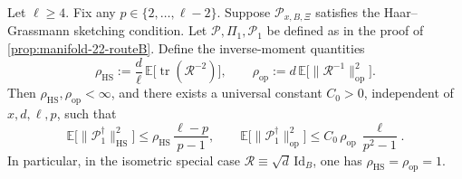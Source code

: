 \documentclass[final,onefignum,onetabnum]{siamart250211}
\begin{document}
\begin{proposition}
  \label{prop:haar-grassmann-pinv-moments}
  Let $\ell\ge 4$.
  Fix any $p\in\{2,\dots,\ell-2\}$.
  Suppose $\mathcal{P}_{x, B, \Xi}$ satisfies the Haar--Grassmann sketching condition.
  Let $\mathcal P,\Pi_1,\mathcal P_1$ be defined as in the proof of \cref{prop:manifold-22-routeB}.
  Define the inverse-moment quantities
  \begin{equation}
    \label{eq:haar-hs-moment}
    \rho_{\mathrm{HS}}
    :=
    \frac{d}{\ell}\,\mathbb E\big[\operatorname{tr}(\mathcal R^{-2})\big],
    \qquad
    \rho_{\mathrm{op}}
    :=
    d\,\mathbb E\big[\|\mathcal R^{-1}\|_{\mathrm{op}}^{2}\big].
  \end{equation}
  Then $\rho_{\mathrm{HS}},\rho_{\mathrm{op}}<\infty$, and there exists a universal constant $C_0>0$, independent of $x,d,\ell,p$, such that
  \[
  \mathbb E\big[\|\mathcal P_1^{\dagger}\|_{\mathrm{HS}}^{2}\big]
  \le
  \rho_{\mathrm{HS}}\,\frac{\ell-p}{p-1},
  \qquad
  \mathbb E\big[\|\mathcal P_1^{\dagger}\|_{\mathrm{op}}^{2}\big]
  \le
  C_0\,\rho_{\mathrm{op}}\,\frac{\ell}{p^{2}-1}.
  \]
  In particular, in the isometric special case $\mathcal R\equiv \sqrt d\,\mathrm{Id}_B$, one has $\rho_{\mathrm{HS}}=\rho_{\mathrm{op}}=1$.
\end{proposition}
\end{document}
